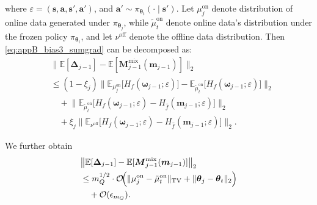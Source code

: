 \documentclass{IEEEtran}
\begin{document}
where $\varepsilon=(\boldsymbol{s},\boldsymbol{a},\boldsymbol{s}',\boldsymbol{a}')$, and $\boldsymbol{a}'\sim\pi_{\boldsymbol{\theta}_t}(\cdot\mid\boldsymbol{s}')$.
Let $\mu_j^{\mathrm{on}}$ denote distribution of online data generated under $\pi_{\boldsymbol{\theta}_j}$, while $\tilde\mu_t^{\mathrm{on}}$ denote online data's distribution under the frozen policy $\pi_{\boldsymbol{\theta}_t}$, and let $\nu^{\mathrm{off}}$ denote the offline data distribution. Then \eqref{eq:appB_bias3_sumgrad} can be decomposed as: 
\begin{equation}
\begin{aligned}
&\bigl\|\mathbb{E}[\boldsymbol{\Delta}_{j-1}]-\mathbb{E}[\boldsymbol{M}^{\mathrm{mix}}_{j-1}(\boldsymbol{m}_{j-1})]\bigr\|_2
\\
&\le (1-\xi_j)\bigl\|\mathbb{E}_{\mu_j^{\mathrm{on}}}\!\big[H_f(\boldsymbol{\omega}_{j-1};\varepsilon)\big]
-\mathbb{E}_{\tilde\mu_t^{\mathrm{on}}}\!\big[H_f(\boldsymbol{\omega}_{j-1};\varepsilon)\big]\bigr\|_2
\\
&\quad+\bigl\|\mathbb{E}_{\tilde\mu_t^{\mathrm{on}}}\!\big[H_f(\boldsymbol{\omega}_{j-1};\varepsilon)-H_{\hat f}(\boldsymbol{m}_{j-1};\varepsilon)\big]\bigr\|_2
\\
&\quad+\xi_j\bigl\|\mathbb{E}_{\nu^{\mathrm{off}}}\!\big[H_f(\boldsymbol{\omega}_{j-1};\varepsilon)-H_{\hat f}(\boldsymbol{m}_{j-1};\varepsilon)\big]\bigr\|_2.
\label{eq:appB_grad_decomp}
\end{aligned}
\end{equation}

We further obtain
\begin{equation}
\begin{aligned}
&\bigl\|\mathbb{E}[\boldsymbol{\Delta}_{j-1}]
-\mathbb{E}[\boldsymbol{M}^{\mathrm{mix}}_{j-1}(\boldsymbol{m}_{j-1})]\bigr\|_2\\
&\le m_Q^{1/2}\cdot\mathcal{O}\!\Bigl(
\|\mu_j^{\mathrm{on}}-\tilde\mu_t^{\mathrm{on}}\|_{\mathrm{TV}}
+\|\boldsymbol{\theta}_j-\boldsymbol{\theta}_t\|_2
\Bigr)\\
&\quad+\mathcal{O}(\epsilon_{m_Q}).
\end{aligned}
\label{eq:appB_grad_tv}
\end{equation}
\end{document}
